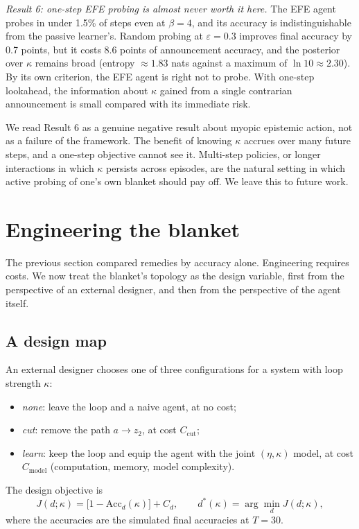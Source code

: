 \documentclass[11pt]{article}
\theoremstyle{definition}
\theoremstyle{remark}
\begin{document}
\emph{Result 6: one-step EFE probing is almost never worth it here.} The EFE
agent probes in under 1.5\% of steps even at $\beta=4$, and its accuracy is
indistinguishable from the passive learner's. Random probing at
$\varepsilon=0.3$ improves final accuracy by 0.7 points, but it costs 8.6 points
of announcement accuracy, and the posterior over $\kappa$ remains broad (entropy
$\approx1.83$ nats against a maximum of $\ln10\approx2.30$). By its own
criterion, the EFE agent is right not to probe. With one-step lookahead, the
information about $\kappa$ gained from a single contrarian announcement is small
compared with its immediate risk.

We read Result 6 as a genuine negative result about myopic epistemic action, not
as a failure of the framework. The benefit of knowing $\kappa$ accrues over many
future steps, and a one-step objective cannot see it. Multi-step policies, or
longer interactions in which $\kappa$ persists across episodes, are the natural
setting in which active probing of one's own blanket should pay off. We leave
this to future work.

\section{Engineering the blanket}\label{sec:engineering}

The previous section compared remedies by accuracy alone. Engineering requires
costs. We now treat the blanket's topology as the design variable, first from
the perspective of an external designer, and then from the perspective of the
agent itself.

\subsection{A design map}

An external designer chooses one of three configurations for a system with loop
strength $\kappa$:
\begin{itemize}
\item \emph{none}: leave the loop and a naive agent, at no cost;
\item \emph{cut}: remove the path $a\to z_2$, at cost $C_{\text{cut}}$;
\item \emph{learn}: keep the loop and equip the agent with the joint
      $(\eta,\kappa)$ model, at cost $C_{\text{model}}$ (computation, memory,
      model complexity).
\end{itemize}
The design objective is
\begin{equation}
J(d;\kappa)=\big[1-\mathrm{Acc}_d(\kappa)\big]+C_d,
\qquad d^\ast(\kappa)=\arg\min_d J(d;\kappa),
\label{eq:design}
\end{equation}
where the accuracies are the simulated final accuracies at $T=30$.
\end{document}
